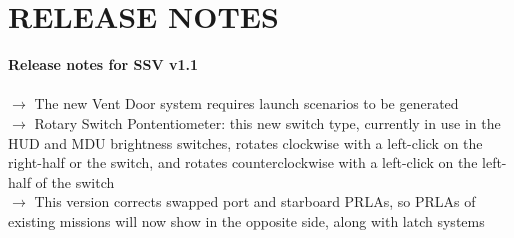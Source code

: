 \documentclass[Space_Shuttle_Vessel_Manual.tex]{subfiles}
\begin{document}
\section{RELEASE NOTES}
\label{sec:release-notes}
\noindent
\textbf{Release notes for SSV v1.1}\\\\
$\rightarrow$ The new Vent Door system requires launch scenarios to be generated\\
$\rightarrow$ Rotary Switch Pontentiometer: this new switch type, currently in use in the HUD and MDU brightness switches, rotates clockwise with a left-click on the right-half or the switch, and rotates counterclockwise with a left-click on the left-half of the switch\\
$\rightarrow$ This version corrects swapped port and starboard PRLAs, so PRLAs of existing missions will now show in the opposite side, along with latch systems\\
\end{document}
